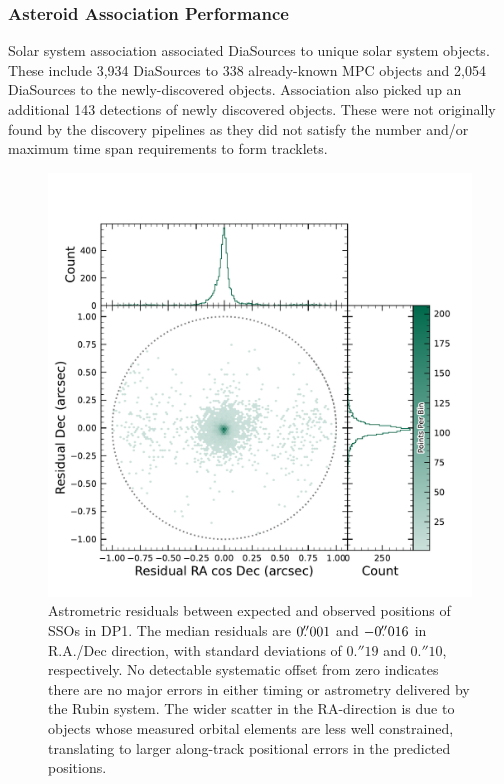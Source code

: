 \subsubsection{Asteroid Association Performance}
\label{ssec:asteroid_association}

Solar system association associated \nsolarsystemsources DiaSources to \nsolarsystemobjects unique solar system objects.
These include 3,934 DiaSources to 338 already-known \gls{MPC} objects and 2,054 DiaSources to the \nnewasteroiddiscoveries  newly-discovered objects.
Association also picked up an additional 143 detections of newly discovered objects.
These were not originally found by the discovery pipelines as they did not satisfy the number and/or maximum time span requirements to form tracklets.

\begin{figure}[htb!]
\centering
\includegraphics[width=0.98\linewidth]{figures/sso_residuals.pdf}
\caption{Astrometric residuals between expected and observed positions of SSOs in \gls{DP1}. 
The median residuals are $0\mbox{$.\!\!^{\prime\prime}$}001$ and $-0\mbox{$.\!\!^{\prime\prime}$}016$ in R.A./Dec direction, with  standard deviations of $0.''19$ and $0.''10$, respectively. 
No detectable systematic offset from zero indicates there are no major errors in either timing or astrometry delivered by the Rubin system. 
The wider scatter in the RA-direction is due to objects whose measured orbital elements are less well constrained, translating to larger along-track positional errors in the predicted positions.}
\label{fig:sso_residuals}
\vspace{0.1cm}
\end{figure}

